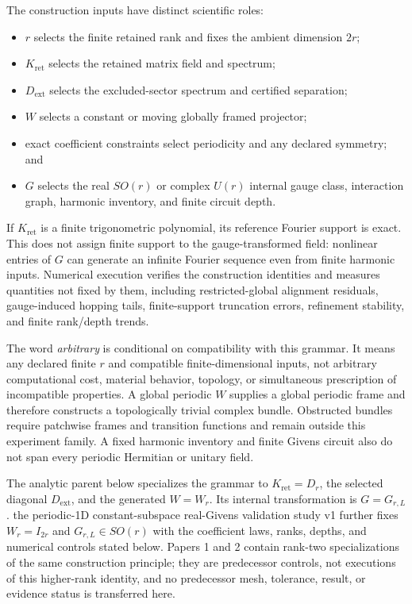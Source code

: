 \documentclass[11pt]{article}
\begin{document}
The construction inputs have distinct scientific roles:

\begin{itemize}
\item $r$ selects the finite retained rank and fixes the ambient dimension $2r$;
\item $K_{\mathrm{ret}}$ selects the retained matrix field and spectrum;
\item $D_{\mathrm{ext}}$ selects the excluded-sector spectrum and certified separation;
\item $W$ selects a constant or moving globally framed projector;
\item exact coefficient constraints select periodicity and any declared symmetry; and
\item $G$ selects the real $SO(r)$ or complex $U(r)$ internal gauge class, interaction
      graph, harmonic inventory, and finite circuit depth.
\end{itemize}

If $K_{\mathrm{ret}}$ is a finite trigonometric polynomial, its reference Fourier
support is exact. This does not assign finite support to the gauge-transformed field:
nonlinear entries of $G$ can generate an infinite Fourier sequence even from finite
harmonic inputs. Numerical execution verifies the construction identities and measures
quantities not fixed by them, including restricted-global alignment residuals,
gauge-induced hopping tails, finite-support truncation errors, refinement stability,
and finite rank/depth trends.

The word \emph{arbitrary} is conditional on compatibility with this grammar. It means
any declared finite $r$ and compatible finite-dimensional inputs, not arbitrary
computational cost, material behavior, topology, or simultaneous prescription of
incompatible properties. A global periodic $W$ supplies a global periodic frame and
therefore constructs a topologically trivial complex bundle. Obstructed bundles require
patchwise frames and transition functions and remain outside this experiment family. A
fixed harmonic inventory and finite Givens circuit also do not span every periodic
Hermitian or unitary field.

The analytic parent below specializes the grammar to
$K_{\mathrm{ret}}=D_r$, the selected diagonal $D_{\mathrm{ext}}$, and the generated
$W=W_r$. Its internal transformation is $G=G_{r,L}$. the periodic-1D constant-subspace real-Givens validation study v1 further fixes
$W_r=I_{2r}$ and $G_{r,L}\in SO(r)$ with the coefficient laws, ranks, depths, and
numerical controls stated below. Papers 1 and 2 contain rank-two specializations of the
same construction principle; they are predecessor controls, not executions of this
higher-rank identity, and no predecessor mesh, tolerance, result, or evidence status is
transferred here.
\end{document}
